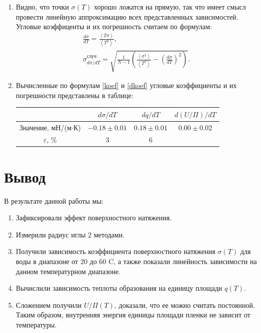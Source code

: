 \documentclass[12pt]{article}
\begin{document}
\begin{enumerate}
        (см. рис. \ref{graph}).
        \begin{figure}[h!]
            \centering
            
            \caption{Графики $\sigma(T)$, $q(T)$, $U/\Pi(T)$}
            \label{graph}
        \end{figure}
        \item Видно, что точки $\sigma(T)$ хорошо ложатся на прямую, так что
        имеет смысл провести линейную аппроксимацию всех представленных 
        зависимостей. Угловые коэффиценты и их погрешность считаем по формулам:
        \begin{eqnarray}
            \frac{d\sigma}{dT} = \frac{\left<T\sigma\right>}
                {\left<T^2\right>}, \label{koef} \\
            \sigma_{d\sigma/dT}^{\text{случ}} = 
                \sqrt{\frac{1}{N - 1}\left(\frac{\left<\sigma^2\right>}
                    {\left<T^2\right>} - 
                        \left(\frac{d\sigma}{dT}\right)^2\right)}\label{dkoef}.
        \end{eqnarray}
        
        \item Вычисленные по формулам \ref{koef} и \ref{dkoef}
        угловые коэффициенты и их погрешности 
        представлены в таблице:
        \begin{table}[H]
            \centering
            \begin{tabular}{|c|c|c|c|}
                \hline
                 & $d\sigma/dT$ & $dq/dT$ & $d(U/\Pi)/dT$ \\ \hline
                Значение, мН/(м$\cdot$К) & $-0.18 \pm 0.01$ & $0.18\pm 0.01 $ & $0.00 \pm 0.02$ \\ \hline
                $\varepsilon$, \% & 3 & 6 & \\ \hline
            \end{tabular}
        \end{table}            
    
    \end{enumerate}
    
    \section{Вывод}
    В результате данной работы мы:
    \begin{enumerate}
        \item Зафиксировали эффект поверхностного натяжения.
        \item Измерили радиус иглы 2 методами.
        \item Получили зависимость коэффициента поверхностного натяжения 
        $\sigma(T)$ для воды в диапазоне от 20 до 60 \textdegree C, а 
        также показали линейность зависимости на данном температурном 
        диапазоне.
        \item Вычислили зависимость теплоты образования на единицу площади 
        $q(T)$. 
        \item Сложением получили $U/\Pi(T)$, доказали, что ее можно считать
        постоянной. Таким образом, внутренняя энергия единицы площади
        пленки не зависит от температуры.
    \end{enumerate}
\end{document}
